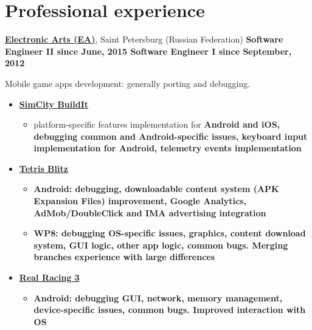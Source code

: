 \section{Professional experience}
{
\fontsize{12pt}{12pt}\selectfont
\href{http://www.ea.com}{\bfseries Electronic Arts (EA)\mdseries},
Saint Petersburg (Russian Federation)
}
\subitem \bfseries Software Engineer II \mdseries since June, 2015
\subitem \bfseries Software Engineer I \mdseries since September, 2012

\vspace{5pt}
\subitem Mobile game apps development: generally porting and debugging.
\begin{itemize}
\setlength{\itemindent}{20pt}
\item
    \href{http://www.ea.com/simcity-buildit}
        {\bfseries SimCity BuildIt\mdseries}
    \begin{itemize}
        \item platform-specific features implementation for \bfseries Android \mdseries and \bfseries iOS\mdseries,
	debugging common and Android-specific issues,
	keyboard input implementation for Android,
        telemetry events implementation
    \end{itemize}
\item
    \href{http://www.tetrisblitz.com}
        {\bfseries Tetris Blitz \mdseries}
    \begin{itemize}
        \item \bfseries Android\mdseries:
        debugging,
        downloadable content system (APK Expansion Files) improvement,
        Google Analytics, AdMob/DoubleClick and IMA advertising integration
    \end{itemize}
    \begin{itemize}
        \item \bfseries WP8\mdseries:
        debugging OS-specific issues,
        graphics,
        content download system,
        GUI logic,
        other app logic,
        common bugs.
        Merging branches experience with large differences
    \end{itemize}
\item
    \href{http://firemonkeys.com.au/downloadR3}
    {\bfseries Real Racing 3\mdseries}
    \begin{itemize}
        \item\bfseries Android\mdseries:
        debugging GUI,
        network,
        memory management,
        device-specific issues,
        common bugs.
        Improved interaction with OS
    \end{itemize}
\end{itemize}

